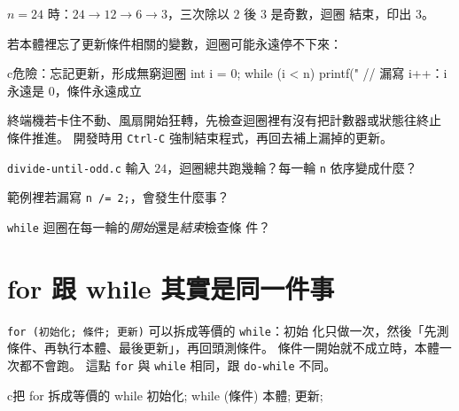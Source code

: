 

$n = 24$ 時：$24 \to 12 \to 6 \to 3$，三次除以 $2$ 後 $3$ 是奇數，迴圈
結束，印出 $3$。


若本體裡忘了更新條件相關的變數，迴圈可能永遠停不下來：

\begin{code}{c}{危險：忘記更新，形成無窮迴圈}
int i = 0;
while (i < n) {
    printf("%
    // 漏寫 i++：i 永遠是 0，條件永遠成立
}
\end{code}

終端機若卡住不動、風扇開始狂轉，先檢查迴圈裡有沒有把計數器或狀態往終止
條件推進。 開發時用 \texttt{Ctrl-C} 強制結束程式，再回去補上漏掉的更新。


\begin{drills}[label=drills:loop-while-basics]
\item \texttt{divide-until-odd.c} 輸入 $24$，迴圈總共跑幾輪？每一輪
\texttt{n} 依序變成什麼？
\item 範例裡若漏寫 \texttt{n /= 2;}，會發生什麼事？
\item \texttt{while} 迴圈在每一輪的\emph{開始}還是\emph{結束}檢查條
件？
\end{drills}

\section{for 跟 while 其實是同一件事}
\label{sec:loop-for-while-equiv}

\texttt{for (初始化; 條件; 更新)} 可以拆成等價的 \texttt{while}：初始
化只做一次，然後「先測條件、再執行本體、最後更新」，再回頭測條件。
條件一開始就不成立時，本體一次都不會跑。 這點 \texttt{for} 與
\texttt{while} 相同，跟 \texttt{do-while} 不同。

\begin{code}{c}{把 for 拆成等價的 while}
初始化;
while (條件) {
    本體;
    更新;
}
\end{code}

